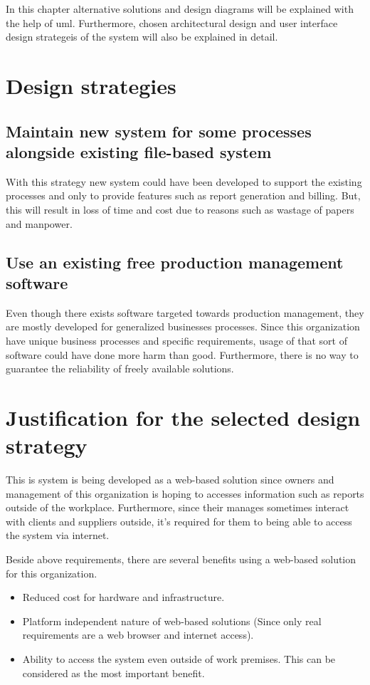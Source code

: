 \documentclass[12pt]{report}
\begin{document}
In this chapter alternative solutions and design diagrams will be explained with the help of \acrshort{uml}. Furthermore, chosen architectural design and user interface design strategeis of the system will also be explained in detail.

\section{Design strategies}

\subsection{Maintain new system for some processes alongside existing file-based system}
With this strategy new system could have been developed to support the existing processes and only to provide features such as report generation and billing. But, this will result in loss of time and cost due to reasons such as wastage of papers and manpower.

\subsection{Use an existing free production management software}
Even though there exists software targeted towards production management, they are mostly developed for generalized businesses processes. Since this organization have unique business processes and specific requirements, usage of that sort of software could have done more harm than good. Furthermore, there is no way to guarantee the reliability of freely available solutions.

\section{Justification for the selected design strategy}
This is system is being developed as a web-based solution since owners and management of this organization is hoping to accesses information such as reports outside of the workplace. Furthermore, since their manages sometimes interact with clients and suppliers outside, it’s required for them to being able to access the system via internet.

Beside above requirements, there are several benefits using a web-based solution for this organization.

\begin{itemize}
	\item Reduced cost for hardware and infrastructure.

	\item Platform independent nature of web-based solutions (Since only real requirements are a web browser and internet access).

	\item Ability to access the system even outside of work premises. This can be considered as the most important benefit.
\end{itemize}
\end{document}
